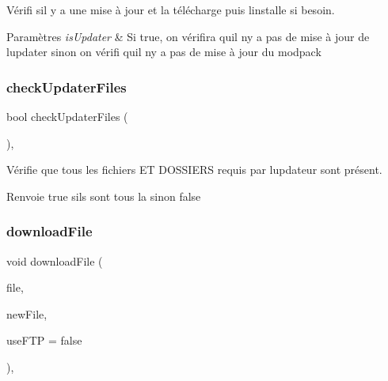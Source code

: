 Vérifi s\textquotesingle{}il y a une mise à jour et la télécharge puis l\textquotesingle{}installe si besoin. 


\begin{DoxyParams}{Paramètres}
{\em is\+Updater} & Si true, on vérifira qu\textquotesingle{}il n\textquotesingle{}y a pas de mise à jour de l\textquotesingle{}updater sinon on vérifi qu\textquotesingle{}il n\textquotesingle{}y a pas de mise à jour du modpack \\
\hline
\end{DoxyParams}
\mbox{\label{classmainWindow_ae7ec250c3c2ec4dbc0aeae77eb546e1b}} 
\subsubsection{\texorpdfstring{check\+Updater\+Files}{checkUpdaterFiles}}
{\footnotesize\ttfamily bool check\+Updater\+Files (\begin{DoxyParamCaption}{ }\end{DoxyParamCaption})\hspace{0.3cm}{\ttfamily [private]}, {\ttfamily [slot]}}



Vérifie que tous les fichiers ET D\+O\+S\+S\+I\+E\+RS requis par l\textquotesingle{}updateur sont présent. 

\begin{DoxyReturn}{Renvoie}
true s\textquotesingle{}ils sont tous la sinon false 
\end{DoxyReturn}
\mbox{\label{classmainWindow_a9f87acf49e48db90c3c8117bb99682b3}} 
\subsubsection{\texorpdfstring{download\+File}{downloadFile}}
{\footnotesize\ttfamily void download\+File (\begin{DoxyParamCaption}\item[{Q\+String}]{file,  }\item[{Q\+String}]{new\+File,  }\item[{bool}]{use\+F\+TP = {\ttfamily false} }\end{DoxyParamCaption})\hspace{0.3cm}{\ttfamily [private]}, {\ttfamily [slot]}}



